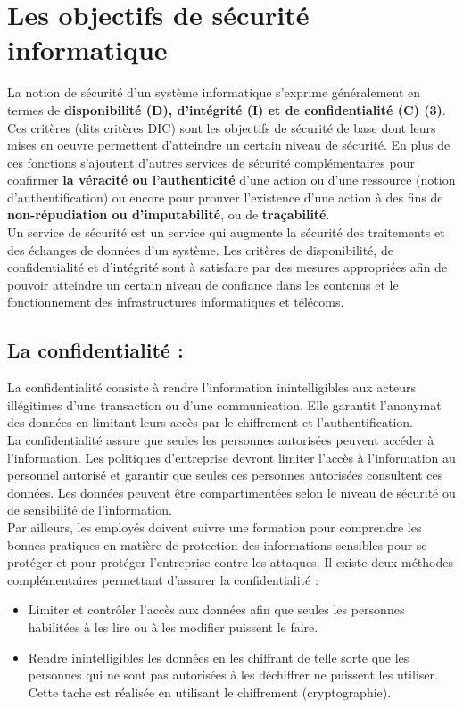 \section{Les objectifs de sécurité informatique }
La notion de sécurité d’un système informatique s’exprime généralement en termes de \textbf{disponibilité (D), d’intégrité (I) et de confidentialité (C) (3)}. Ces critères (dits critères DIC) sont les objectifs de sécurité de base dont leurs mises en oeuvre permettent d’atteindre un certain niveau de sécurité. En plus de ces fonctions s’ajoutent d’autres services de sécurité complémentaires pour confirmer \textbf{la véracité ou l’authenticité}  d’une action ou d’une ressource (notion d’authentification) ou encore pour prouver l’existence d’une action à des fins de \textbf{non-répudiation ou d’imputabilité}, ou de \textbf{traçabilité}.\\

Un service de sécurité est un service qui augmente la sécurité des traitements et des échanges de données d’un système. Les critères de disponibilité, de confidentialité et d’intégrité sont à satisfaire par des mesures appropriées afin de pouvoir atteindre un certain niveau de confiance dans les contenus et le fonctionnement des infrastructures informatiques et télécoms.

\subsection{La confidentialité : }
La confidentialité consiste à rendre l'information inintelligibles aux acteurs illégitimes d’une transaction ou d’une communication. Elle garantit l’anonymat des données en limitant leurs accès par le chiffrement et l’authentification.\\
La confidentialité assure que seules les personnes autorisées peuvent accéder à l’information. Les politiques d’entreprise devront limiter l’accès à l’information au personnel autorisé et garantir que seules ces personnes autorisées consultent ces données. Les données peuvent être compartimentées selon le niveau de sécurité ou de
sensibilité de l’information.\\
Par ailleurs, les employés doivent suivre une formation pour comprendre les bonnes pratiques en matière de protection des informations sensibles pour se protéger et pour protéger l’entreprise contre les attaques. Il existe deux méthodes complémentaires permettant d’assurer la confidentialité :
\begin{itemize}[label=\textbullet]
	\item Limiter et contrôler l’accès aux données afin que seules les personnes habilitées à les lire ou à les modifier puissent le faire.
	\item Rendre inintelligibles les données en les chiffrant de telle sorte que les personnes qui ne sont pas autorisées à les déchiffrer ne puissent les utiliser. Cette tache est réalisée en utilisant le chiffrement (cryptographie).
\end{itemize}

